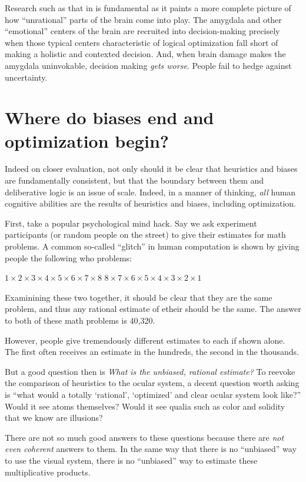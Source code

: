 \documentclass{article}
\begin{document}
Research such as that in \textcite{hsu05} is fundamental as it paints a more complete picture of how ``unrational'' parts of the brain come into play.
The amygdala and other ``emotional'' centers of the brain are recruited into decision-making precisely when those typical centers characteristic of logical optimization fall short of making a holistic and contexted decision.
And, when brain damage makes the amygdala uninvokable, decision making \emph{gets worse}.
People fail to hedge against uncertainty.


\section{Where do biases end and optimization begin?}

Indeed on closer evaluation, not only should it be clear that heuristics and biases are fundamentally consistent, but that the boundary between them and deliberative logic is an issue of scale. Indeed, in a manner of thinking, \emph{all} human cognitive abilities are the results of heuristics and biases, including optimization.

First, take a popular psychological mind hack.
Say we ask experiment participants (or random people on the street) to give their estimates for math problems.
A common so-called ``glitch'' in human computation is shown by giving people the following who problems:

\begin{exe}
	\ex $1\times2\times3\times4\times5\times6\times7\times8$
	\ex $8\times7\times6\times5\times4\times3\times2\times1$
\end{exe}

Examinining these two together, it should be clear that they are the same problem, and thus any rational estimate of etheir should be the same.
The answer to both of these math problems is 40,320.

However, people give tremendously different estimates to each if shown alone.
The first often receives an estimate in the hundreds, the second in the thousands.

But a good question then is \textit{What is the \emph{unbiased}, rational estimate?}
To reevoke the comparison of heuristics to the ocular system, a decent question worth asking is ``what would a totally `rational', `optimized' and clear ocular system look like?''
Would it see atoms themselves?
Would it see qualia such as color and solidity that we know are illusions?

There are not so much good answers to these questions because there are \emph{not even coherent} answers to them.
In the same way that there is no ``unbiased'' way to use the visual system, there is no ``unbiased'' way to estimate these multiplicative products.
\end{document}
